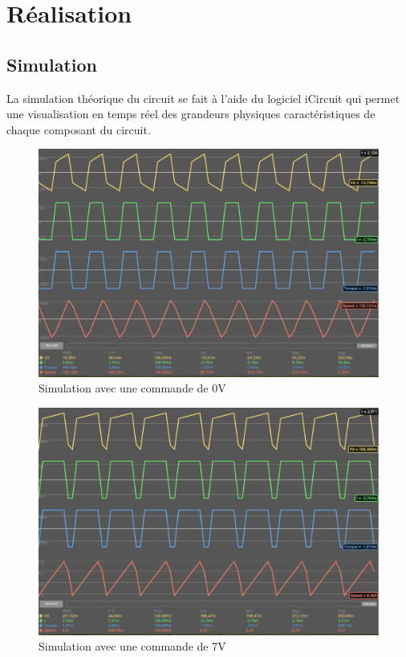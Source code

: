 \documentclass[a4paper]{article}
\begin{document}
\section{Réalisation}

\subsection{Simulation}

La simulation théorique du circuit se fait à l'aide du logiciel iCircuit qui permet une visualisation en temps réel des grandeurs physiques caractéristiques de chaque composant du circuit.
\begin{figure}
	\centering
	\includegraphics[width=1\textwidth]{simu0v}
	\caption{Simulation avec une commande de 0V}
\end{figure}
\begin{figure}
	\centering
	\includegraphics[width=1\textwidth]{simu7v}
	\caption{Simulation avec une commande de 7V}
\end{figure}
\end{document}
